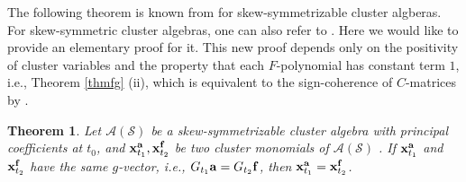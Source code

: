 \documentclass[14pt]{amsart}
\newtheorem{Theorem}{Theorem}[section]
\begin{document}
The following theorem is  known from \cite{GHKK} for skew-symmetrizable cluster algberas. For skew-symmetric cluster algebras, one can also refer to \cite{DWZ}. Here we would like to provide an elementary proof for it. This new proof  depends only on the positivity of cluster variables and  the property that each $F$-polynomial has constant term $1$, i.e., Theorem \ref{thmfg} (ii), which is equivalent to the sign-coherence of $C$-matrices by  \cite[Proposition 5.6]{FZ3}.

\begin{Theorem}\label{thmmonomial}
Let $\mathcal A(\mathcal S)$ be a skew-symmetrizable cluster algebra with principal coefficients at $t_0$, and ${\bf x}_{t_1}^{\bf a}, {\bf x}_{t_2}^{\bf f}$ be  two cluster monomials of $\mathcal A(\mathcal S)$ . If ${\bf x}_{t_1}^{\bf a}$ and ${\bf x}_{t_2}^{\bf f}$ have the same $g$-vector, i.e., $G_{t_1}{\bf a}=G_{t_2}{\bf f}$, then ${\bf x}_{t_1}^{\bf a}={\bf x}_{t_2}^{\bf f}$.

\end{Theorem}
\end{document}
